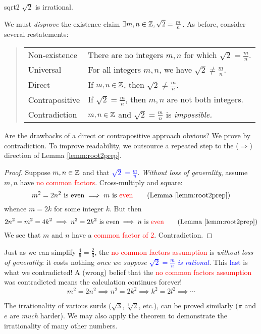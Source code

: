 \begin{thm}{}{sqrt2}
	$\sqrt 2$ is irrational.
\end{thm}

We must \emph{disprove} the existence claim $\exists m,n\in\mathbb{Z}, \sqrt 2=\frac mn$.
As before, consider several restatements:\vspace{-5pt}
\begin{quote}
	\begin{tabular}{@{}ll}
		Non-existence& There are no integers $m,n$ for which $\sqrt 2=\frac mn$.\\
		Universal&For all integers $m,n$, we have $\sqrt 2\neq \frac mn$.\\
		Direct&If $m,n\in\mathbb{Z}$, then $\sqrt 2\neq\frac mn$.\\
		Contrapositive&If $\sqrt 2=\frac mn$, then $m,n$ are not both integers.\\
		Contradiction&$m,n\in\mathbb{Z}$ and $\sqrt 2=\frac mn$ is \emph{impossible.}
	\end{tabular}
\end{quote}

Are the drawbacks of a direct or contrapositive approach obvious? We prove by contradiction. To improve readability, we outsource a repeated step to the ($\Rightarrow$) direction of Lemma \ref{lemm:root2prep}.

\begin{proof}
	Suppose $m,n\in\mathbb{Z}$ and that \textcolor{blue}{$\sqrt 2=\frac mn$}. \emph{Without loss of generality}, assume $m,n$ have \textcolor{red}{no common factors}. Cross-multiply and square:
	\[
		m^2=2n^2\text{ is even} \implies m \text{ is \textcolor{red}{even}} \tag{Lemma \ref{lemm:root2prep}}
	\]
	whence $m=2k$ for some integer $k$. But then
	\[
		2n^2=m^2=4k^2\implies n^2=2k^2 \text{ is even} \implies n \text{ is \textcolor{red}{even}} \tag{Lemma \ref{lemm:root2prep}}
	\]
	We see that $m$ and $n$ have a \textcolor{red}{common factor of 2}. Contradiction.
\end{proof}


Just as we can simplify $\frac 46=\frac 23$, the \textcolor{red}{no common factors assumption} is \emph{without loss of generality}: it costs nothing \emph{once we suppose \textcolor{blue}{$\sqrt 2=\frac mn$ is rational}.} This \textcolor{blue}{last} is what we contradicted! A (wrong) belief that the \textcolor{red}{no common factors assumption} was contradicted means the calculation continues forever!
\[
	m^2=2n^2\implies n^2=2k^2\implies k^2=2l^2\implies\cdots
\]

The irrationality of various surds ($\sqrt 3,\sqrt[3]{2}$, etc.), can be proved similarly ($\pi$ and $e$ are \emph{much} harder). We may also apply the theorem to demonstrate the irrationality of many other numbers.

